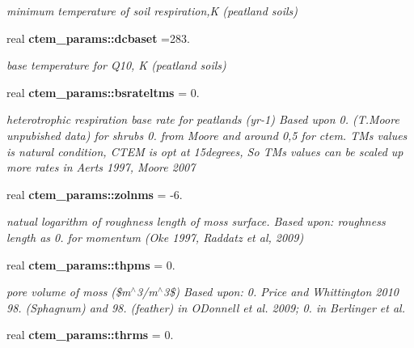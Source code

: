 \begin{DoxyCompactItemize}
\begin{DoxyCompactList}\small\item\em minimum temperature of soil respiration,K (peatland soils) \end{DoxyCompactList}\item 
\hypertarget{namespacectem__params_a720de170a379ed4cd4fa79b3568adeee}{}real {\bfseries ctem\+\_\+params\+::dcbaset} =283.\label{namespacectem__params_a720de170a379ed4cd4fa79b3568adeee}

\begin{DoxyCompactList}\small\item\em base temperature for Q10, K (peatland soils) \end{DoxyCompactList}\item 
\hypertarget{namespacectem__params_aba3dc779db095e9a91c71fa765ce42c5}{}real {\bfseries ctem\+\_\+params\+::bsrateltms} = 0.\label{namespacectem__params_aba3dc779db095e9a91c71fa765ce42c5}

\begin{DoxyCompactList}\small\item\em heterotrophic respiration base rate for peatlands (yr-\/1) Based upon 0. (T.\+Moore unpubished data) for shrubs 0. from Moore and around 0,5 for ctem. T\+M\textquotesingle{}s values is natural condition, C\+T\+E\+M is opt at 15degrees, So T\+M\textquotesingle{}s values can be scaled up more rates in Aerts 1997, Moore 2007 \end{DoxyCompactList}\item 
\hypertarget{namespacectem__params_abe1470e353073f75f2abe335f4016d1d}{}real {\bfseries ctem\+\_\+params\+::zolnms} = -\/6.\label{namespacectem__params_abe1470e353073f75f2abe335f4016d1d}

\begin{DoxyCompactList}\small\item\em natual logarithm of roughness length of moss surface. Based upon\+: roughness length as 0. for momentum (Oke 1997, Raddatz et al, 2009) \end{DoxyCompactList}\item 
\hypertarget{namespacectem__params_a185de4b0b5fa3c48b51dc78fa11a8111}{}real {\bfseries ctem\+\_\+params\+::thpms} = 0.\label{namespacectem__params_a185de4b0b5fa3c48b51dc78fa11a8111}

\begin{DoxyCompactList}\small\item\em pore volume of moss (\$m$^\wedge$3/m$^\wedge$3\$) Based upon\+: 0. Price and Whittington 2010 98. (Sphagnum) and 98. (feather) in O\textquotesingle{}Donnell et al. 2009; 0. in Berlinger et al. \end{DoxyCompactList}\item 
\hypertarget{namespacectem__params_af4042dde8e345c8260586b172ede74d1}{}real {\bfseries ctem\+\_\+params\+::thrms} = 0.\label{namespacectem__params_af4042dde8e345c8260586b172ede74d1}


\end{DoxyCompactItemize}
